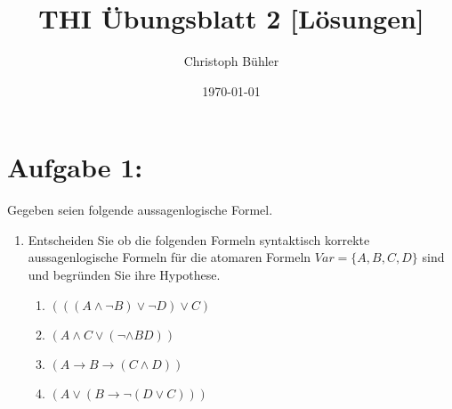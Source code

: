 \documentclass[12pt]{article}
\title{THI Übungsblatt 2 [Lösungen]}
\author{Christoph Bühler}
\date{\today}
\begin{document}
  \maketitle

  \section*{Aufgabe 1:}
    Gegeben seien folgende aussagenlogische Formel.

    \begin{enumerate}[label=(\alph*)]
      \item Entscheiden Sie ob die folgenden Formeln syntaktisch korrekte aussagenlogische Formeln für die atomaren Formeln \(Var = \{ A, B, C, D \}\) sind und begründen Sie ihre Hypothese.

        \begin{enumerate}[label=(\roman*)]
          \item \((((A \wedge \neg B) \vee \neg D) \vee C)\)
          \item \((A \wedge C \vee (\neg \wedge BD))\)
          \item \((A \rightarrow B \rightarrow (C \wedge D))\)
          \item \((A \vee (B \rightarrow \neg (D \vee C)))\)
        \end{enumerate}
    \end{enumerate}
\end{document}
